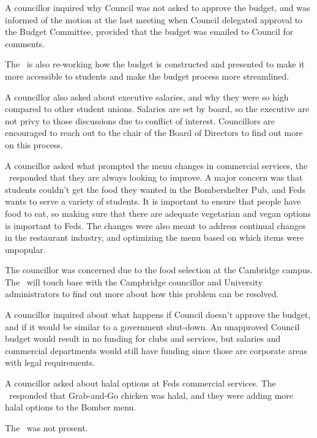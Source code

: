 \begin{information}
    A councillor inquired why Council was not asked to approve the budget, and 
    was informed of the motion at the last meeting when Council delegated
    approval to the Budget Committee, provided that the budget was emailed to 
    Council for comments.  

    The \vpof\ is also re-working how the budget is constructed and presented to
    make it more accessible to students and make the budget process more 
    streamlined. 

    A councillor also asked about executive salaries, and why they were
    so high compared to other student unions. Salaries are set by board, so the 
    executive are not privy to those discussions due to conflict of interest.
    Councillors are encouraged to reach out to the chair of the Board of 
    Directors to find out more on this process. 

    A councillor asked what prompted the menu changes in commercial services,
    the \vpof\ responded that they are always looking to improve. 
    A major concern was that students couldn't get the food they wanted in the 
    Bombershelter Pub, and Feds wants to serve a variety of students. It is
    important to ensure that people have food to eat, so making sure that there
    are adequate vegetarian and vegan options is important to Feds. 
    The changes were also meant to address continual changes in the restaurant
    industry, and optimizing the menu based on which items were unpopular. 

    The councillor was concerned due to the food selection at the Cambridge 
    campus. The \vpof\ will touch base with the Campbridge councillor and 
    University administrators to find out more about how this problem can 
    be resolved. 

    A councillor inquired about what happens if Council doesn't approve the 
    budget, and if it would be similar to a government shut-down. An unapproved
    Council budget would result in no funding for clubs and services, but 
    salaries and commercial departments would still have funding since those
    are corporate areas with legal requirements. 

    A councillor asked about halal options at Feds commercial services.
    The \vpof\ responded that Grab-and-Go chicken was halal, and they were
    adding more halal options to the Bomber menu. 

\end{information}

\begin{information}

    The \vpe\ was not present. 


\end{information}


